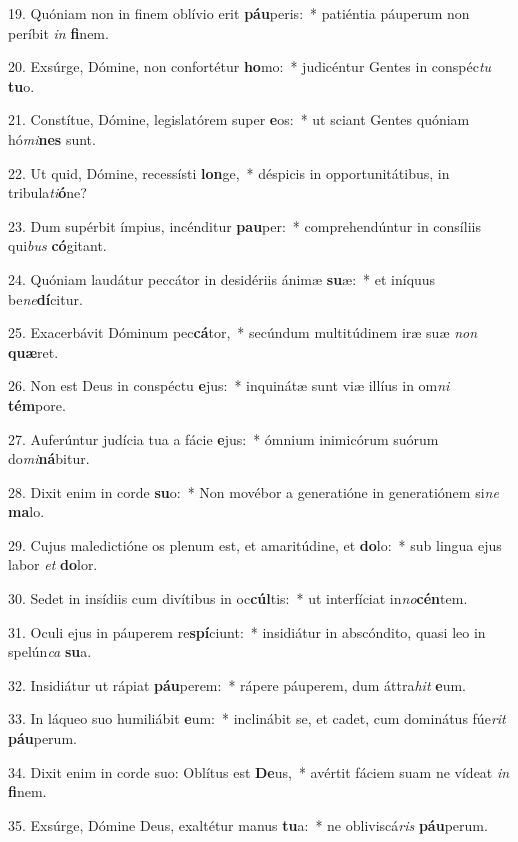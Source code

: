 19. Quóniam non in finem oblívio erit \textbf{páu}peris:~*  patiéntia páuperum non períbit \textit{in} \textbf{fi}nem.\

20. Exsúrge, Dómine, non confortétur \textbf{ho}mo:~*  judicéntur Gentes in conspéc\textit{tu} \textbf{tu}o.\

21. Constítue, Dómine, legislatórem super \textbf{e}os:~*  ut sciant Gentes quóniam hó\textit{mi}\textbf{nes} sunt.\

22. Ut quid, Dómine, recessísti \textbf{lon}ge,~*  déspicis in opportunitátibus, in tribula\textit{ti}\textbf{ó}ne?\

23. Dum supérbit ímpius, incénditur \textbf{pau}per:~*  comprehendúntur in consíliis qui\textit{bus} \textbf{có}gitant.\

24. Quóniam laudátur peccátor in desidériis ánimæ \textbf{su}æ:~*  et iníquus be\textit{ne}\textbf{dí}citur.\

25. Exacerbávit Dóminum pec\textbf{cá}tor,~*  secúndum multitúdinem iræ suæ \textit{non} \textbf{quæ}ret.\

26. Non est Deus in conspéctu \textbf{e}jus:~*  inquinátæ sunt viæ illíus in om\textit{ni} \textbf{tém}pore.\

27. Auferúntur judícia tua a fácie \textbf{e}jus:~*  ómnium inimicórum suórum do\textit{mi}\textbf{ná}bitur.\

28. Dixit enim in corde \textbf{su}o:~*  Non movébor a generatióne in generatiónem si\textit{ne} \textbf{ma}lo.\

29. Cujus maledictióne os plenum est, et amaritúdine, et \textbf{do}lo:~*  sub lingua ejus labor \textit{et} \textbf{do}lor.\

30. Sedet in insídiis cum divítibus in oc\textbf{cúl}tis:~*  ut interfíciat in\textit{no}\textbf{cén}tem.\

31. Oculi ejus in páuperem re\textbf{spí}ciunt:~*  insidiátur in abscóndito, quasi leo in spelún\textit{ca} \textbf{su}a.\

32. Insidiátur ut rápiat \textbf{páu}perem:~*  rápere páuperem, dum áttra\textit{hit} \textbf{e}um.\

33. In láqueo suo humiliábit \textbf{e}um:~*  inclinábit se, et cadet, cum dominátus fúe\textit{rit} \textbf{páu}perum.\

34. Dixit enim in corde suo: Oblítus est \textbf{De}us,~*  avértit fáciem suam ne vídeat \textit{in} \textbf{fi}nem.\

35. Exsúrge, Dómine Deus, exaltétur manus \textbf{tu}a:~*  ne obliviscá\textit{ris} \textbf{páu}perum.\

